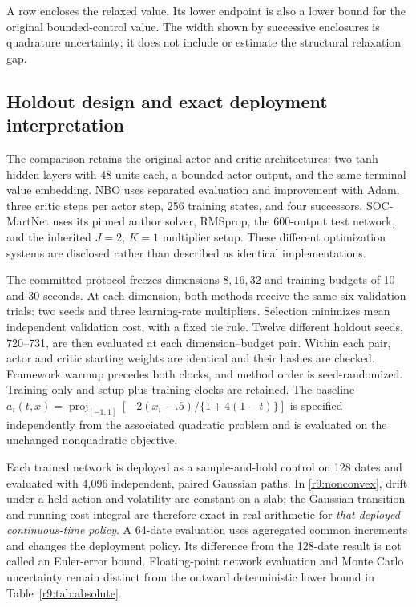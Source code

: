 \begin{table}[t]
\centering\scriptsize
\caption{Absolute lower bounds for the original nonconvex control problem}\label{r9:tab:absolute}

\par\smallskip\footnotesize A row encloses the relaxed value. Its lower endpoint is also a lower bound for the original bounded-control value. The width shown by successive enclosures is quadrature uncertainty; it does not include or estimate the structural relaxation gap.
\end{table}

\subsection{Holdout design and exact deployment interpretation}
The comparison retains the original actor and critic architectures: two tanh hidden layers with 48 units each, a bounded actor output, and the same terminal-value embedding. NBO uses separated evaluation and improvement with Adam, three critic steps per actor step, 256 training states, and four successors. SOC-MartNet uses its pinned author solver, RMSprop, the 600-output test network, and the inherited $J=2$, $K=1$ multiplier setup. These different optimization systems are disclosed rather than described as identical implementations.

The committed protocol freezes dimensions $8,16,32$ and training budgets of 10 and 30 seconds. At each dimension, both methods receive the same six validation trials: two seeds and three learning-rate multipliers. Selection minimizes mean independent validation cost, with a fixed tie rule. Twelve different holdout seeds, 720--731, are then evaluated at each dimension--budget pair. Within each pair, actor and critic starting weights are identical and their hashes are checked. Framework warmup precedes both clocks, and method order is seed-randomized. Training-only and setup-plus-training clocks are retained. The baseline $a_i(t,x)=\operatorname{proj}_{[-1,1]}[-2(x_i-.5)/\{1+4(1-t)\}]$ is specified independently from the associated quadratic problem and is evaluated on the unchanged nonquadratic objective.

Each trained network is deployed as a sample-and-hold control on 128 dates and evaluated with 4,096 independent, paired Gaussian paths. In \eqref{r9:nonconvex}, drift under a held action and volatility are constant on a slab; the Gaussian transition and running-cost integral are therefore exact in real arithmetic for \emph{that deployed continuous-time policy}. A 64-date evaluation uses aggregated common increments and changes the deployment policy. Its difference from the 128-date result is not called an Euler-error bound. Floating-point network evaluation and Monte Carlo uncertainty remain distinct from the outward deterministic lower bound in Table~\ref{r9:tab:absolute}.


